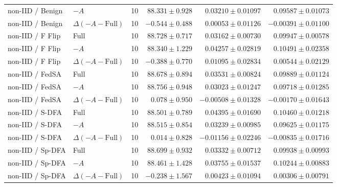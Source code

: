 \begin{table}[t]
\begin{tabular}{llrrrr}
non-IID / Benign & $-A$ & 10 & $88.331 \pm 0.928$ & $0.03210 \pm 0.01097$ & $0.09587 \pm 0.01073$ \\
non-IID / Benign & $\Delta(-A-\mathrm{Full})$ & 10 & $-0.544 \pm 0.488$ & $0.00053 \pm 0.01126$ & $-0.00391 \pm 0.01100$ \\
non-IID / F Flip & Full & 10 & $88.728 \pm 0.717$ & $0.03162 \pm 0.00730$ & $0.09947 \pm 0.00578$ \\
non-IID / F Flip & $-A$ & 10 & $88.340 \pm 1.229$ & $0.04257 \pm 0.02819$ & $0.10491 \pm 0.02358$ \\
non-IID / F Flip & $\Delta(-A-\mathrm{Full})$ & 10 & $-0.388 \pm 0.770$ & $0.01095 \pm 0.02834$ & $0.00544 \pm 0.02129$ \\
non-IID / FedSA & Full & 10 & $88.678 \pm 0.894$ & $0.03531 \pm 0.00824$ & $0.09889 \pm 0.01124$ \\
non-IID / FedSA & $-A$ & 10 & $88.756 \pm 0.948$ & $0.03023 \pm 0.01247$ & $0.09718 \pm 0.01285$ \\
non-IID / FedSA & $\Delta(-A-\mathrm{Full})$ & 10 & $0.078 \pm 0.950$ & $-0.00508 \pm 0.01328$ & $-0.00170 \pm 0.01643$ \\
non-IID / S-DFA & Full & 10 & $88.501 \pm 0.789$ & $0.04395 \pm 0.01690$ & $0.10460 \pm 0.01218$ \\
non-IID / S-DFA & $-A$ & 10 & $88.515 \pm 0.854$ & $0.03239 \pm 0.00985$ & $0.09625 \pm 0.01175$ \\
non-IID / S-DFA & $\Delta(-A-\mathrm{Full})$ & 10 & $0.014 \pm 0.828$ & $-0.01156 \pm 0.02246$ & $-0.00835 \pm 0.01716$ \\
non-IID / Sp-DFA & Full & 10 & $88.699 \pm 0.932$ & $0.03332 \pm 0.00712$ & $0.09938 \pm 0.00993$ \\
non-IID / Sp-DFA & $-A$ & 10 & $88.461 \pm 1.428$ & $0.03755 \pm 0.01537$ & $0.10244 \pm 0.00883$ \\
non-IID / Sp-DFA & $\Delta(-A-\mathrm{Full})$ & 10 & $-0.238 \pm 1.567$ & $0.00423 \pm 0.01094$ & $0.00306 \pm 0.00791$ \\
\bottomrule
\end{tabular}
\end{table}

